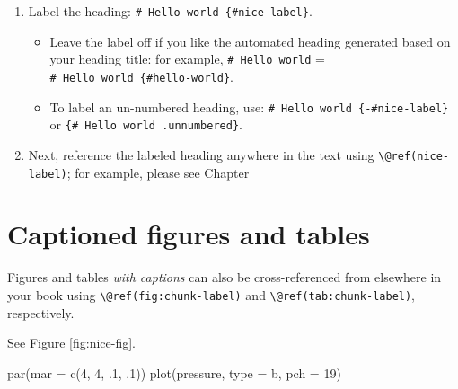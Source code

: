 \documentclass[
]{book}
\makeatletter
\newenvironment{Shaded}{\begin{snugshade}}{\end{snugshade}}
\newcommand{\AttributeTok}[1]{\textcolor[rgb]{0.77,0.63,0.00}{#1}}
\newcommand{\DecValTok}[1]{\textcolor[rgb]{0.00,0.00,0.81}{#1}}
\newcommand{\FunctionTok}[1]{\textcolor[rgb]{0.00,0.00,0.00}{#1}}
\newcommand{\NormalTok}[1]{#1}
\newcommand{\StringTok}[1]{\textcolor[rgb]{0.31,0.60,0.02}{#1}}
\providecommand{\tightlist}{%
  \setlength{\itemsep}{0pt}\setlength{\parskip}{0pt}}
\newenvironment{kframe}{%
\medskip{}
\setlength{\fboxsep}{.8em}
 \def\at@end@of@kframe{}%
 \ifinner\ifhmode%
  \def\at@end@of@kframe{\end{minipage}}%
  \begin{minipage}{\columnwidth}%
 \fi\fi%
 \def\FrameCommand##1{\hskip\@totalleftmargin \hskip-\fboxsep
 \colorbox{shadecolor}{##1}\hskip-\fboxsep
     \hskip-\linewidth \hskip-\@totalleftmargin \hskip\columnwidth}%
 \MakeFramed {\advance\hsize-\width
   \@totalleftmargin\z@ \linewidth\hsize
   \@setminipage}}%
 {\par\unskip\endMakeFramed%
 \at@end@of@kframe}
\renewenvironment{Shaded}{\begin{kframe}}{\end{kframe}}
\theoremstyle{definition}
\theoremstyle{definition}
\theoremstyle{definition}
\theoremstyle{definition}
\theoremstyle{remark}
\makeatother
\begin{document}
\begin{enumerate}
\def\labelenumi{\arabic{enumi}.}
\tightlist
\item
  Label the heading: \texttt{\#\ Hello\ world\ \{\#nice-label\}}.

  \begin{itemize}
  \tightlist
  \item
    Leave the label off if you like the automated heading generated based on your heading title: for example, \texttt{\#\ Hello\ world} = \texttt{\#\ Hello\ world\ \{\#hello-world\}}.
  \item
    To label an un-numbered heading, use: \texttt{\#\ Hello\ world\ \{-\#nice-label\}} or \texttt{\{\#\ Hello\ world\ .unnumbered\}}.
  \end{itemize}
\item
  Next, reference the labeled heading anywhere in the text using \texttt{\textbackslash{}@ref(nice-label)}; for example, please see Chapter
\end{enumerate}

\hypertarget{captioned-figures-and-tables}{%
\section*{Captioned figures and tables}\label{captioned-figures-and-tables}}

Figures and tables \emph{with captions} can also be cross-referenced from elsewhere in your book using \texttt{\textbackslash{}@ref(fig:chunk-label)} and \texttt{\textbackslash{}@ref(tab:chunk-label)}, respectively.

See Figure \ref{fig:nice-fig}.

\begin{Shaded}
\begin{Highlighting}[]
\FunctionTok{par}\NormalTok{(}\AttributeTok{mar =} \FunctionTok{c}\NormalTok{(}\DecValTok{4}\NormalTok{, }\DecValTok{4}\NormalTok{, .}\DecValTok{1}\NormalTok{, .}\DecValTok{1}\NormalTok{))}
\FunctionTok{plot}\NormalTok{(pressure, }\AttributeTok{type =} \StringTok{\textquotesingle{}b\textquotesingle{}}\NormalTok{, }\AttributeTok{pch =} \DecValTok{19}\NormalTok{)}
\end{Highlighting}
\end{Shaded}
\end{document}
